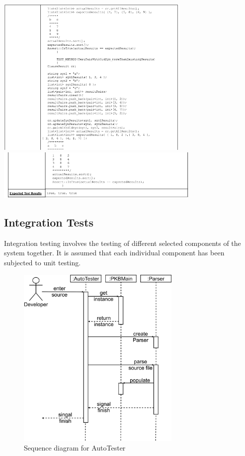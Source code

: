 \documentclass[12pt]{article}
\begin{document}
{{{{{{{{{{\begin{table}[!htbp]
\end{table}
\begin{table}[!htbp]
  \centering 
 \includegraphics[width=0.7\textwidth]{PQL4.png}
 \includegraphics[width=0.737\textwidth]{PQL5.png}
\end{table}
\subsection{Integration Tests}
Integration testing involves the testing of different selected components of the system together. It is assumed that each individual component has been subjected to unit testing.
\begin{figure}[!htbp]
  \centering 
  \caption{Sequence diagram for AutoTester}
 \includegraphics[width=0.7\textwidth]{SDTesting.png}
\end{figure}
}}}}}}}}}}
\end{document}
